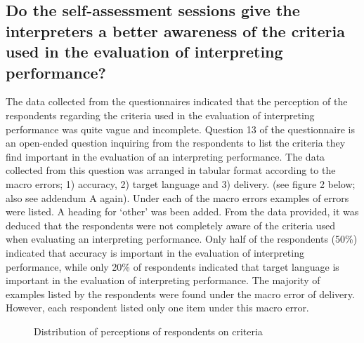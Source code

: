 \documentclass[output=paper]{langsci/langscibook}
\begin{document}
\subsection{Do the self-assessment sessions give the interpreters a better awareness of the criteria used in the evaluation of interpreting performance?}

The data collected from the questionnaires indicated that the perception of the respondents regarding the criteria used in the evaluation of interpreting performance was quite vague and incomplete. Question 13 of the questionnaire is an open-ended question inquiring from the respondents to list the criteria they find important in the evaluation of an interpreting performance.  The data collected from this question was arranged in tabular format according to the macro errors; 1) accuracy, 2) target language and 3) delivery. (see figure 2 below; also see addendum A again). Under each of the macro errors examples of errors were listed. A heading for ‘other’ was been added. From the data provided, it was deduced that the respondents were not completely aware of the criteria used when evaluating an interpreting performance.  Only half of the respondents (50\%) indicated that accuracy is important in the evaluation of interpreting performance, while only 20\% of respondents indicated that target language is important in the evaluation of interpreting performance. The majority of examples listed by the respondents were found under the macro error of delivery. However, each respondent listed only one item under this macro error. 

\begin{figure}
\caption{Distribution of perceptions of respondents on criteria}
\label{fig:deysel:2}
\end{figure}
\end{document}
